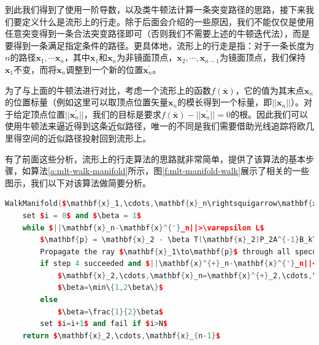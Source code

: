 到此我们得到了使用一阶导数，以及类牛顿法计算一条突变路径的思路，接下来我们要定义什么是流形上的行走。除于后面会介绍的一些原因，我们不能仅仅是使用任意突变得到一条合法突变路径即可（否则我们不需要上述的牛顿迭代法），而是要得到一条满足指定条件的路径。更具体地，流形上的行走是指：对于一条长度为$n$的路径$\mathbf{x}_1,\cdots\mathbf{x}_n$，其中$\mathbf{x}_1$和$\mathbf{x}_n$为非镜面顶点，$\mathbf{x}_2,\cdots,\mathbf{x}_{n-1}$为镜面顶点，我们保持$\mathbf{x}_1$不变，而将$\mathbf{x}_n$调整到一个新的位置$\mathbf{x}^{'}_n$。

\begin{myshaded}
	为了与上面的牛顿法进行对比，考虑一个流形上的函数$f(\bar{\mathbf{x}})$，它的值为其末点$\mathbf{x}_n$的位置标量（例如这里可以取顶点位置矢量$\mathbf{x}_n$的模长得到一个标量，即$||\mathbf{x}_n||$）。对于给定顶点位置$||\mathbf{x}^{'}_n||$，我们的目标是要求$f(\bar{\mathbf{x}})-||\mathbf{x}^{'}_n||=0$的根。因此我们可以使用牛顿法来逼近得到这条近似路径，唯一的不同是我们需要借助光线追踪将欧几里得空间的近似路径投射回到流形上。
\end{myshaded}

有了前面这些分析，流形上的行走算法的思路就非常简单，\cite{a:ManifoldExplorationExpanded,a:LIGHTTRANSPORTONPATHSPACEMANIFOLDS}提供了该算法的基本步骤，如算法\ref{a:mlt-walk-manifold}所示，图\ref{f:mlt-manifold-walk}展示了相关的一些图示，我们以下对该算法做简要分析。

\begin{algorithm}
\begin{lstlisting}[language=C++, mathescape]
WalkManifold($\mathbf{x}_1,\cdots,\mathbf{x}_n\rightsquigarrow\mathbf{x}^{'}_n$)
	set $i = 0$ and $\beta = 1$
	while $||\mathbf{x}_n-\mathbf{x}^{'}_n||>\varepsilon L$
		$\mathbf{p} = \mathbf{x}_2 - \beta T(\mathbf{x}_2)P_2A^{-1}B_kT(\mathbf{x}_n)^{T}(\mathbf{x}^{'}_n-\mathbf{x}_n)$
		Propagate the ray $\mathbf{x}_1\to\mathbf{p}$ through all specular interactions, producing $\mathbf{x}^{+}_2,\cdots,\mathbf{x}^{n}_n$.
		if step 4 succeeded and $||\mathbf{x}^{+}_n-\mathbf{x}^{'}_n||<||\mathbf{x}_n-\mathbf{x}^{'}_n||$
			$\mathbf{x}_2,\cdots,\mathbf{x}_n=\mathbf{x}^{+}_2,\cdots,\mathbf{x}^{+}_n$
			$\beta=\min\{1,2\beta\}$
		else
			$\beta=\frac{1}{2}\beta$
		set $i=i+1$ and fail if $i>N$
	return $\mathbf{x}_2,\cdots,\mathbf{x}_{n-1}$
\end{lstlisting}
\caption{每个顶点存储的数据，其中位置，法线以及位置和法线的导数都是通过获取顶点的时候从表面表述中获得，而该顶点关于镜面流形的各个矩阵则通过微分几何相关的知识计算而得，并且这些矩阵的计算仅依赖于上述的顶点几何数据}
\label{a:mlt-walk-manifold}
\end{algorithm}

